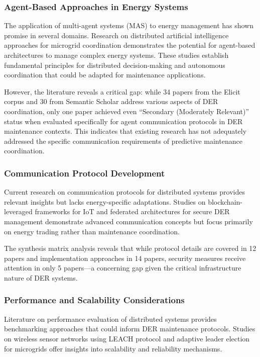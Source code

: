 \documentclass[12pt,a4paper]{article}
\begin{document}
\subsubsection{Agent-Based Approaches in Energy Systems}

The application of multi-agent systems (MAS) to energy management has shown promise in several domains. Research on distributed artificial intelligence approaches for microgrid coordination demonstrates the potential for agent-based architectures to manage complex energy systems. These studies establish fundamental principles for distributed decision-making and autonomous coordination that could be adapted for maintenance applications.

However, the literature reveals a critical gap: while 34 papers from the Elicit corpus and 30 from Semantic Scholar address various aspects of DER coordination, only one paper achieved even ``Secondary (Moderately Relevant)'' status when evaluated specifically for agent communication protocols in DER maintenance contexts. This indicates that existing research has not adequately addressed the specific communication requirements of predictive maintenance coordination.

\subsubsection{Communication Protocol Development}

Current research on communication protocols for distributed systems provides relevant insights but lacks energy-specific adaptations. Studies on blockchain-leveraged frameworks for IoT and federated architectures for secure DER management demonstrate advanced communication concepts but focus primarily on energy trading rather than maintenance coordination.

The synthesis matrix analysis reveals that while protocol details are covered in 12 papers and implementation approaches in 14 papers, security measures receive attention in only 5 papers---a concerning gap given the critical infrastructure nature of DER systems.

\subsubsection{Performance and Scalability Considerations}

Literature on performance evaluation of distributed systems provides benchmarking approaches that could inform DER maintenance protocols. Studies on wireless sensor networks using LEACH protocol and adaptive leader election for microgrids offer insights into scalability and reliability mechanisms.
\end{document}
